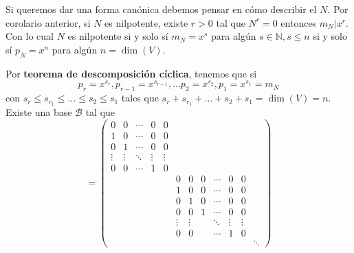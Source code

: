 \newpage

Si queremos dar una forma canónica debemos pensar en cómo
describir el $N$. Por corolario anterior, si $N$ es nilpotente,
existe $r>0$ tal que $N^{r}=0$ entonces $m_N|x^{r}$. Con lo cual
$N$ es nilpotente si y solo sí
$m_N=x^{s}$ para algún $s\in \mathbb{N}, s\leq n$ si y solo sí
$p_N=x^{n}$ para algún $n=\dim(V)$.

Por \textbf{teorema de descomposición cíclica}, tenemos que si
$$
p_r=x^{s_r},
p_{r-1}=x^{s_{r-1}},
\dots
p_2=x^{s_2},
p_1=x^{s_1}=m_N
$$
con $s_r \leq s_{r_1} \leq \dots \leq s_2 \leq s_1$ tales que
$s_r + s_{r_1} + \dots + s_2 + s_1 =\dim(V)=n$. Existe una base
$\mathcal{B}$ tal que
\begin{equation*}[N]=\left(
	\begin{smallmatrix}
		0      & 0      & \cdots & 0      & 0      &        &          &        &        &        &        &\\
		1      & 0      & \cdots & 0      & 0      &        &          &        &        &        &        &\\
		0      & 1      & \cdots & 0      & 0      &        &          &        &        &        &        &\\
		\vdots & \vdots & \ddots & \vdots & \vdots &        &          &        &        &        &        &\\
		0      & 0      & \cdots & 1      & 0      &        &          &        &        &        &        &\\
		&        &        &        &        & 0      & 0      & 0        & \cdots & 0      & 0      &\\
		&        &        &        &        & 1      & 0      & 0        & \cdots & 0      & 0      &\\
		&        &        &        &        & 0      & 1      & 0        & \cdots & 0      & 0      &\\
		&        &        &        &        & 0      & 0      & 1        & \cdots & 0      & 0      &\\
		&        &        &        &        & \vdots & \vdots &          & \ddots & \vdots & \vdots &\\
		&        &        &        &        & 0      & 0      &          & \cdots & 1      & 0      &\\
		&        &        &        &        &        &        &          &        &        &        &\ddots 
	\end{smallmatrix}\right)
\end{equation*}

